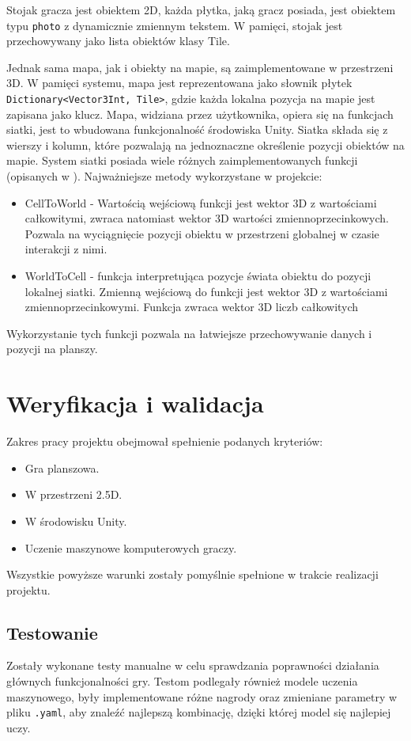 \documentclass[a4paper,twoside,12pt]{book}
\begin{document}
	Stojak gracza jest obiektem 2D, każda płytka, jaką gracz posiada, jest obiektem typu \texttt{photo} z dynamicznie zmiennym tekstem. W pamięci, stojak jest przechowywany jako lista obiektów klasy Tile.
	
	Jednak sama mapa, jak i obiekty na mapie, są zaimplementowane w przestrzeni 3D. W pamięci systemu, mapa jest reprezentowana jako słownik płytek \texttt{Dictionary<Vector3Int, Tile>}, gdzie każda lokalna pozycja na mapie jest zapisana jako klucz. Mapa, widziana przez użytkownika, opiera się na funkcjach siatki, jest to wbudowana funkcjonalność środowiska Unity. Siatka składa się z wierszy i kolumn, które pozwalają na jednoznaczne określenie pozycji obiektów na mapie. System siatki posiada wiele różnych zaimplementowanych funkcji (opisanych w  \cite{bib:unity_grid}). Najważniejsze metody wykorzystane w projekcie:
	\begin{itemize}
		\item CellToWorld - Wartością wejściową funkcji jest wektor 3D z wartościami całkowitymi, zwraca natomiast wektor 3D wartości zmiennoprzecinkowych. Pozwala na wyciągnięcie pozycji obiektu w przestrzeni globalnej w czasie interakcji z nimi.
		\item WorldToCell - funkcja interpretująca pozycje świata obiektu do pozycji lokalnej siatki. Zmienną wejściową do funkcji jest wektor 3D z wartościami zmiennoprzecinkowymi. Funkcja zwraca wektor 3D liczb całkowitych
	\end{itemize}
	Wykorzystanie tych funkcji pozwala na łatwiejsze przechowywanie danych i pozycji na planszy.
	
	\chapter{Weryfikacja i walidacja}%
	\label{ch:06}
	Zakres pracy projektu obejmował spełnienie podanych kryteriów:
	\begin{itemize}
		\item Gra planszowa.
		\item W przestrzeni 2.5D.
		\item W środowisku Unity.
		\item Uczenie maszynowe komputerowych graczy.
	\end{itemize}
	Wszystkie powyższe warunki zostały pomyślnie spełnione w trakcie realizacji projektu.
	\section{Testowanie}
	Zostały wykonane testy manualne w celu sprawdzania poprawności działania głównych funkcjonalności gry. Testom podlegały również modele uczenia maszynowego, były implementowane różne nagrody oraz zmieniane parametry w pliku \texttt{.yaml}, aby znaleźć najlepszą kombinację, dzięki której model się najlepiej uczy.
\end{document}
